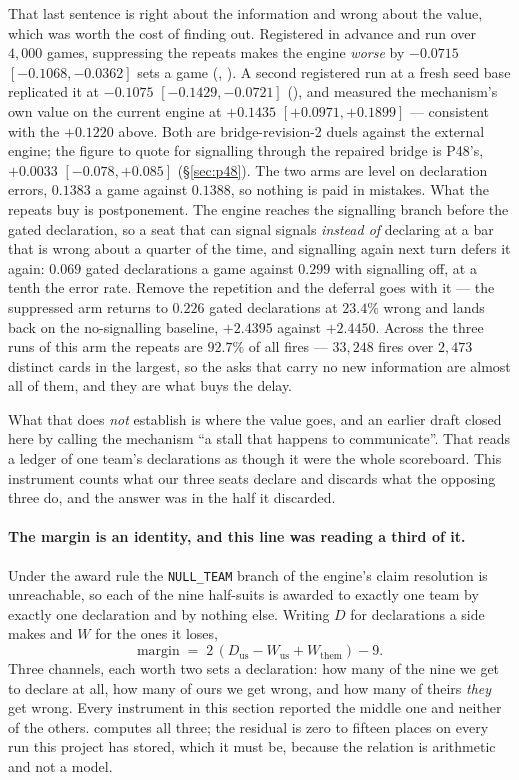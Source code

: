 \documentclass[11pt,letterpaper]{article}
\begin{document}
That last sentence is right about the information and wrong about the value,
which was worth the cost of finding out. Registered in advance and run over
$4{,}000$ games, suppressing the repeats makes the engine \emph{worse} by
$-0.0715$ $[-0.1068, -0.0362]$ sets a game
(,
). A second registered run at a
fresh seed base replicated it at $-0.1075$ $[-0.1429, -0.0721]$
(), and measured the mechanism's own value
on the current engine at $+0.1435$ $[+0.0971, +0.1899]$ --- consistent with the
$+0.1220$ above. Both are bridge-revision-2 duels against the external engine;
the figure to quote for signalling through the repaired bridge is P48's,
$+0.0033$ $[-0.078, +0.085]$ (\S\ref{sec:p48}).
The two arms are level on declaration errors, $0.1383$ a game against
$0.1388$, so nothing is paid in mistakes. What the repeats buy is
postponement. The engine reaches the signalling branch before the gated
declaration, so a seat that can signal signals \emph{instead of} declaring at a
bar that is wrong about a quarter of the time, and signalling again next turn
defers it again: $0.069$ gated declarations a game against $0.299$ with
signalling off, at a tenth the error rate. Remove the repetition and the
deferral goes with it --- the suppressed arm returns to $0.226$ gated
declarations at $23.4\%$ wrong and lands back on the no-signalling baseline,
$+2.4395$ against $+2.4450$. Across the three runs of this arm the repeats are
$92.7\%$ of all fires --- $33{,}248$ fires over $2{,}473$ distinct cards in
the largest, so the asks that carry no new information are almost all of
them, and they are what buys the delay.

What that does \emph{not} establish is where the value goes, and an earlier
draft closed here by calling the mechanism ``a stall that happens to
communicate''. That reads a ledger of one team's declarations as though it were
the whole scoreboard. This instrument counts what our three seats declare and
discards what the opposing three do, and the answer was in the half it
discarded.

\paragraph{The margin is an identity, and this line was reading a third of
it.} Under the award rule the \texttt{NULL\_TEAM} branch of the engine's claim
resolution is unreachable, so each of the nine half-suits is awarded to exactly
one team by exactly one declaration and by nothing else. Writing $D$ for
declarations a side makes and $W$ for the ones it loses,
\[
  \text{margin} \;=\; 2\,(D_{\text{us}} - W_{\text{us}} + W_{\text{them}}) - 9 .
\]
Three channels, each worth two sets a declaration: how many of the nine we get
to declare at all, how many of ours we get wrong, and how many of theirs
\emph{they} get wrong. Every instrument in this section reported the middle one
and neither of the others.  computes all
three; the residual is zero to fifteen places on every run this project has
stored, which it must be, because the relation is arithmetic and not a model.
\end{document}
